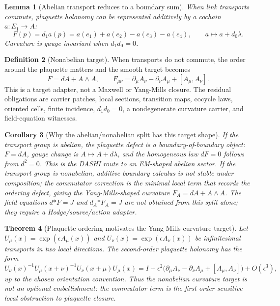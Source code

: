 \documentclass[11pt]{article}
\theoremstyle{definition}
\newtheorem{definition}{Definition}[section]
\theoremstyle{plain}
\newtheorem{theorem}[definition]{Theorem}
\newtheorem{lemma}[definition]{Lemma}
\newtheorem{corollary}[definition]{Corollary}
\theoremstyle{remark}
\begin{document}
\begin{lemma}[Abelian transport reduces to a boundary sum]
When link transports commute, plaquette holonomy can be represented additively
by a cochain \(a:E_1\to A\):
\[
F(p)=d_1a(p)=a(e_1)+a(e_2)-a(e_3)-a(e_4),
\qquad
a\mapsto a+d_0\lambda.
\]
Curvature is gauge invariant when \(d_1d_0=0\).
\end{lemma}

\begin{definition}[Nonabelian target]
When transports do not commute, the order around the plaquette matters and
the smooth target becomes
\[
F=dA+A\wedge A,
\qquad
F_{\mu\nu}=
\partial_\mu A_\nu-\partial_\nu A_\mu+[A_\mu,A_\nu].
\]
This is a target adapter, not a Maxwell or Yang-Mills closure. The residual
obligations are carrier patches, local sections, transition maps, cocycle
laws, oriented cells, finite incidence, \(d_1d_0=0\), a nondegenerate curvature
carrier, and field-equation witnesses.
\end{definition}

\begin{corollary}[Why the abelian/nonabelian split has this target shape]
If the transport group is abelian, the plaquette defect is a
boundary-of-boundary object: \(F=dA\), gauge change is
\(A\mapsto A+d\lambda\), and the homogeneous law \(dF=0\) follows from
\(d^2=0\). This is the DASHI route to an EM-shaped abelian sector. If the
transport group is nonabelian, additive boundary calculus is not stable under
composition; the commutator correction is the minimal local term that records
the ordering defect, giving the Yang-Mills-shaped curvature
\(F_A=dA+A\wedge A\). The field equations \(d{*F}=J\) and
\(d_A{*F_A}=J\) are not obtained from this split alone; they require a
Hodge/source/action adapter.
\end{corollary}

\begin{theorem}[Plaquette ordering motivates the Yang-Mills curvature target]
Let \(U_\mu(x)=\exp(\epsilon A_\mu(x))\) and
\(U_\nu(x)=\exp(\epsilon A_\nu(x))\) be infinitesimal transports in two local
directions. The second-order plaquette holonomy has the form
\[
U_\nu(x)^{-1}U_\mu(x+\nu)^{-1}U_\nu(x+\mu)U_\mu(x)
=
I+\epsilon^2\bigl(
\partial_\mu A_\nu-\partial_\nu A_\mu+[A_\mu,A_\nu]
\bigr)+O(\epsilon^3),
\]
up to the chosen orientation convention. Thus the nonabelian curvature target
is not an optional embellishment: the commutator term is the first
order-sensitive local obstruction to plaquette closure.
\end{theorem}
\end{document}
